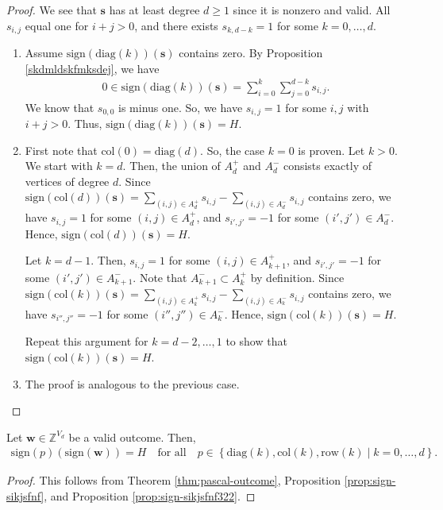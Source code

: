 \begin{proof}
    We see that \( \mathbf{s} \) has at least degree \( d \geq 1 \) since it is nonzero and valid. All \( s_{i,j} \) equal one for \( i + j > 0 \), and there exists \( s_{k, d-k} = 1 \) for some \( k = 0, \dots, d \).

    \begin{enumerate}
        \item Assume \( \mathrm{sign}(\mathrm{diag}(k))(\mathbf{s}) \) contains zero. By Proposition \ref{skdmldskfmksdej}, we have
        \begin{align*}
            0 \in \mathrm{sign}(\mathrm{diag}(k))(\mathbf{s}) = \sum_{i=0}^k \sum_{j=0}^{d-k} s_{i,j}.
        \end{align*}
        We know that \( s_{0,0} \) is minus one. So, we have \( s_{i,j} = 1 \) for some \( i,j \) with \( i + j > 0 \). Thus, \( \mathrm{sign}(\mathrm{diag}(k))(\mathbf{s}) = H \).
        
        \item First note that \( \mathrm{col}(0) = \mathrm{diag}(d) \). So, the case \( k = 0 \) is proven. Let \( k > 0 \). We start with \( k = d \). Then, the union of \( A^+_d \) and \( A^-_d \) consists exactly of vertices of degree \( d \). Since \( \mathrm{sign}(\mathrm{col}(d))(\mathbf{s}) =  \sum_{(i,j) \in A_d^+} s_{i,j} - \sum_{(i,j) \in A_d^-} s_{i,j} \) contains zero, we have \( s_{i,j} = 1 \) for some \( (i,j) \in A_d^+ \), and \( s_{i',j'} = -1 \) for some \( (i',j') \in A_d^- \). Hence, \( \mathrm{sign}(\mathrm{col}(d))(\mathbf{s}) = H \).
        
        Let \( k = d-1 \). Then, \( s_{i,j} = 1 \) for some \( (i,j) \in A_{k+1}^+ \), and \( s_{i',j'} = -1 \) for some \( (i',j') \in A_{k+1}^- \). Note that \( A_{k+1}^- \subset A^+_{k} \) by definition. Since \( \mathrm{sign}(\mathrm{col}(k))(\mathbf{s}) =  \sum_{(i,j) \in A_k^+} s_{i,j} - \sum_{(i,j) \in A_k^-} s_{i,j} \) contains zero, we have \( s_{i'',j''} = -1 \) for some \( (i'',j'') \in A_{k}^- \). Hence, \( \mathrm{sign}(\mathrm{col}(k))(\mathbf{s}) = H \).

        Repeat this argument for \( k = d-2, \dots, 1 \) to show that \( \mathrm{sign}(\mathrm{col}(k))(\mathbf{s}) = H \).

        \item The proof is analogous to the previous case.
    \end{enumerate}
\end{proof}

\begin{corollary}
    Let \( \mathbf{w} \in \mathbb{Z}^{V_d} \) be a valid outcome. Then, 
    \begin{align*}
        \mathrm{sign}(p)(\mathrm{sign}(\mathbf{w})) = H \quad \text{for all} \quad p \in \left\{ \mathrm{diag}(k), \mathrm{col}(k), \mathrm{row}(k) \mid k = 0, \dots, d \right\}.
    \end{align*}
\end{corollary}

\begin{proof}
    This follows from Theorem \ref{thm:pascal-outcome}, Proposition \ref{prop:sign-sikjsfnf}, and Proposition \ref{prop:sign-sikjsfnf322}.
\end{proof}